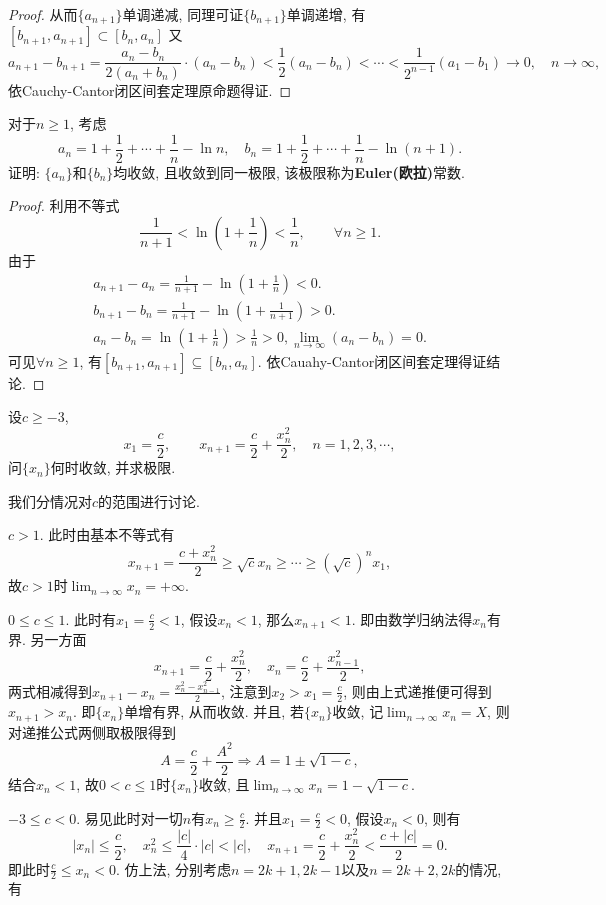 \begin{quiza}
\begin{proof}
从而\(\{a_{n+1}\}\)单调递减, 同理可证\(\{b_{n+1}\}\)单调递增, 有\([b_{n+1},a_{n+1}]\subset [b_{n},a_{n}]\) 又\[a_{n+1}-b_{n+1}=\frac{a_n-b_n}{2(a_n+b_n)}\cdot(a_n-b_n)<\frac{1}{2}(a_n-b_n)<\cdots<\frac{1}{2^{n-1}}(a_1-b_1)\rightarrow 0,\quad n\rightarrow\infty,\]依Cauchy-Cantor闭区间套定理原命题得证.
\end{proof}
\woe 对于\(n\geqslant 1\), 考虑\[a_n=1+\frac{1}{2}+\cdots+\frac{1}{n}-\ln n,\quad b_n=1+\frac{1}{2}+\cdots+\frac{1}{n}-\ln(n+1).\]
证明: \(\{a_n\}\)和\(\{b_n\}\)均收敛, 且收敛到同一极限, 该极限称为\textbf{Euler(欧拉)}常数.
\begin{proof}
利用不等式\[\frac{1}{n+1}<\ln\left(1+\frac{1}{n}\right)<\frac{1}{n},\qquad\forall n\geqslant 1.\]由于
    \begin{gather*}
      a_{n+1}-a_{n}=\frac{1}{n+1}-\ln\left(1+\frac{1}{n}\right)<0.\\
      b_{n+1}-b_{n}=\frac{1}{n+1}-\ln\left(1+\frac{1}{n+1}\right)>0.\\
      a_n-b_n=\ln\left(1+\frac{1}{n}\right)>\frac{1}{n}>0, \lim_{n\rightarrow\infty}(a_n-b_n)=0.
    \end{gather*}
可见\(\forall n\geqslant 1\), 有\([b_{n+1},a_{n+1}]\subseteq [b_n,a_n]\). 依Cauahy-Cantor闭区间套定理得证结论.
\end{proof}
\woe 设\(c\geqslant -3\), \[x_1=\frac{c}{2},\qquad x_{n+1}=\frac{c}{2}+\frac{x_n^2}{2},\quad n=1,2,3,\cdots,\]问\(\{x_n\}\)何时收敛, 并求极限.
\begin{solution}
我们分情况对\(c\)的范围进行讨论.
\begin{asparaenum}[\bfseries (i)]
\item \(c> 1\). 此时由基本不等式有\[x_{n+1}=\frac{c+x_n^2}{2}\geqslant\sqrt{c}x_n\geqslant\cdots\geqslant \left(\sqrt{c}\right)^nx_1,\]
故\(c>1\)时\(\lim_{n\rightarrow\infty}x_n=+\infty\).
\item \(0\leqslant c\leqslant 1\). 此时有\(x_1=\frac{c}{2}<1\), 假设\(x_n<1\), 那么\(x_{n+1}<1\). 即由数学归纳法得\(x_n\)有界. 另一方面\[x_{n+1}=\frac{c}{2}+\frac{x_n^2}{2},\quad x_n=\frac{c}{2}+\frac{x_{n-1}^2}{2},\]两式相减得到\(x_{n+1}-x_{n}=\frac{x_n^2-x_{n-1}^2}{2}\), 注意到\(x_2>x_1=\frac{c}{2}\), 则由上式递推便可得到\(x_{n+1}>x_n\). 即\(\{x_n\}\)单增有界, 从而收敛. 并且, 若\(\{x_n\}\)收敛, 记\(\lim_{n\rightarrow\infty}x_n=X\), 则对递推公式两侧取极限得到\[A=\frac{c}{2}+\frac{A^2}{2}\Rightarrow A=1\pm\sqrt{1-c},\]结合\(x_n<1\), 故\(0<c\leqslant 1\)时\(\{x_n\}\)收敛, 且\(\lim_{n\rightarrow\infty}x_n=1-\sqrt{1-c}.\)
\item \label{c2x2f}\(-3\leqslant c< 0\). 易见此时对一切\(n\)有\(x_n\geqslant\frac{c}{2}\). 并且\(x_1=\frac{c}{2}<0\), 假设\(x_n<0\), 则有\[\left|x_n\right|\leqslant\frac{c}{2},\quad x_n^2\leqslant\frac{\left|c\right|}{4}\cdot|c|<|c|,\quad x_{n+1}=\frac{c}{2}+\frac{x_n^2}{2}<\frac{c+|c|}{2}=0.\]即此时\(\frac{c}{2}\leqslant x_n<0\). 仿上法, 分别考虑\(n=2k+1,2k-1\)以及\(n=2k+2,2k\)的情况, 有\begin{align}

\end{align}
\end{asparaenum}
\end{solution}
\end{quiza}
